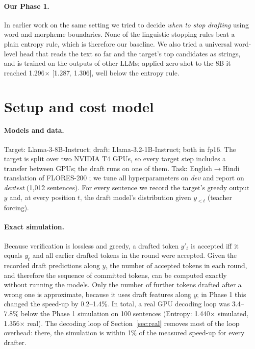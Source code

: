 \documentclass[11pt]{article}
\newcommand{\x}{$\times$}
\begin{document}
\paragraph{Our Phase 1.} In earlier work on the same setting we tried to decide \emph{when to stop
drafting} using word and morpheme boundaries. None of the linguistic stopping rules beat a plain
entropy rule, which is therefore our baseline. We also tried a universal word-level head that reads the
text so far and the target's top candidates as strings, and is trained on the outputs of other LLMs;
applied zero-shot to the 8B it reached 1.296\x{} [1.287, 1.306], well below the entropy rule.

\section{Setup and cost model}
\label{sec:setup}

\paragraph{Models and data.} Target: Llama-3-8B-Instruct; draft: Llama-3.2-1B-Instruct; both in
fp16. The target is split over two NVIDIA T4 GPUs, so every target step includes a transfer between
GPUs; the draft runs on one of them. Task: English$\to$Hindi translation of FLORES-200 \citep{nllb2022}; we tune all
hyperparameters on \emph{dev} and report on \emph{devtest} (1{,}012 sentences). For every sentence we
record the target's greedy output $y$ and, at every position $t$, the draft model's distribution given
$y_{<t}$ (teacher forcing).

\paragraph{Exact simulation.} Because verification is lossless and greedy, a drafted token $y'_t$ is
accepted iff it equals $y_t$ and all earlier drafted tokens in the round were accepted. Given the
recorded draft predictions along $y$, the number of accepted tokens in each round, and therefore the
sequence of committed tokens, can be computed exactly without running the models. Only the number of
further tokens drafted after a wrong one is approximate, because it uses draft features along $y$; in
Phase 1 this changed the speed-up by 0.2--1.4\%. In total, a real GPU decoding loop was 3.4--7.8\% below
the Phase 1 simulation on 100 sentences (Entropy: 1.440\x{} simulated, 1.356\x{} real). The decoding
loop of Section~\ref{sec:real} removes most of the loop overhead: there, the simulation is within 1\% of
the measured speed-up for every drafter.
\end{document}
